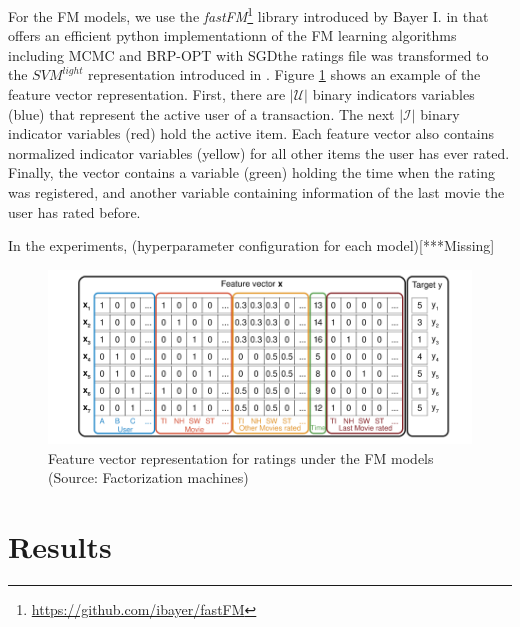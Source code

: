 For the FM models, we use the \textit{fastFM}\footnote{\url{https://github.com/ibayer/fastFM}} library introduced by Bayer I. in \cite{bayer2015fastfm} that offers an efficient python implementationn of the FM learning algorithms including MCMC and BRP-OPT with SGDthe ratings file was transformed to the $SVM^{light}$ representation introduced in \cite{joachims1999making}. Figure \ref{fig:featurevector} shows an example of the feature vector representation. First, there are $|\mathcal{U}|$ binary indicators variables (blue) that represent the active user of a transaction. The next $|\mathcal{I}|$ binary indicator variables (red) hold the active item. Each feature vector also contains normalized indicator variables (yellow) for all other items the user has ever rated. Finally, the vector contains a variable (green) holding the time when the rating was registered, and another variable containing information of the last movie the user has rated before.

In the experiments, (hyperparameter configuration for each model)[***Missing]

\begin{figure}[h]
\centering
\includegraphics[scale=0.9]{images/featurevectors}
\caption[Feature vector representation in the $SVM^{light}$ format]{Feature vector representation for ratings under the FM models (Source: Factorization machines\cite{rendle2010factorization})}
\label{fig:featurevector}
\end{figure}

\section{Results}

